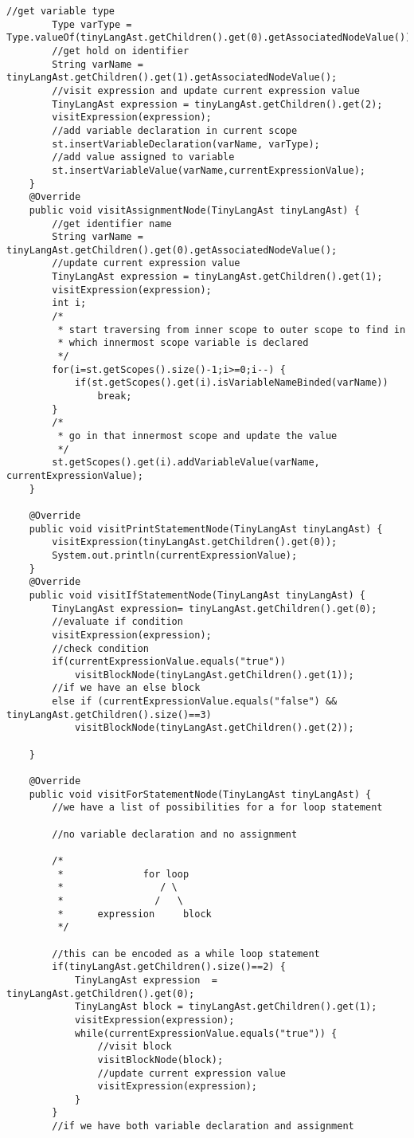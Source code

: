 \begin{lstlisting}[basicstyle=\miniscule,caption=Interpreter,label=listing:interpreter]
		//get variable type
		Type varType = Type.valueOf(tinyLangAst.getChildren().get(0).getAssociatedNodeValue());
		//get hold on identifier 
		String varName = tinyLangAst.getChildren().get(1).getAssociatedNodeValue(); 
		//visit expression and update current expression value
		TinyLangAst expression = tinyLangAst.getChildren().get(2);
		visitExpression(expression);
		//add variable declaration in current scope 
		st.insertVariableDeclaration(varName, varType);
		//add value assigned to variable 
		st.insertVariableValue(varName,currentExpressionValue);
	}
	@Override
	public void visitAssignmentNode(TinyLangAst tinyLangAst) {
		//get identifier name
		String varName = tinyLangAst.getChildren().get(0).getAssociatedNodeValue();
		//update current expression value
		TinyLangAst expression = tinyLangAst.getChildren().get(1); 
		visitExpression(expression);
		int i;
		/*
		 * start traversing from inner scope to outer scope to find in
		 * which innermost scope variable is declared
		 */
		for(i=st.getScopes().size()-1;i>=0;i--) {
			if(st.getScopes().get(i).isVariableNameBinded(varName))
				break;
		}
		/*
		 * go in that innermost scope and update the value 
		 */
		st.getScopes().get(i).addVariableValue(varName, currentExpressionValue);
	}

	@Override
	public void visitPrintStatementNode(TinyLangAst tinyLangAst) {
		visitExpression(tinyLangAst.getChildren().get(0));
		System.out.println(currentExpressionValue);
	}
	@Override
	public void visitIfStatementNode(TinyLangAst tinyLangAst) {
		TinyLangAst expression= tinyLangAst.getChildren().get(0);
		//evaluate if condition 
		visitExpression(expression);
		//check condition
		if(currentExpressionValue.equals("true"))
			visitBlockNode(tinyLangAst.getChildren().get(1));
		//if we have an else block 
		else if (currentExpressionValue.equals("false") && tinyLangAst.getChildren().size()==3)
			visitBlockNode(tinyLangAst.getChildren().get(2));

	}

	@Override
	public void visitForStatementNode(TinyLangAst tinyLangAst) {
		//we have a list of possibilities for a for loop statement
		
		//no variable declaration and no assignment
		
		/*
		 * 				for loop
		 * 				   / \
		 * 			  	  /   \
         * 		expression	   block
		 */
		
		//this can be encoded as a while loop statement
		if(tinyLangAst.getChildren().size()==2) {
			TinyLangAst expression  = tinyLangAst.getChildren().get(0);
			TinyLangAst block = tinyLangAst.getChildren().get(1);
			visitExpression(expression);
			while(currentExpressionValue.equals("true")) {
				//visit block 
				visitBlockNode(block);
				//update current expression value
				visitExpression(expression);
			}
		}
		//if we have both variable declaration and assignment
		

\end{lstlisting}
